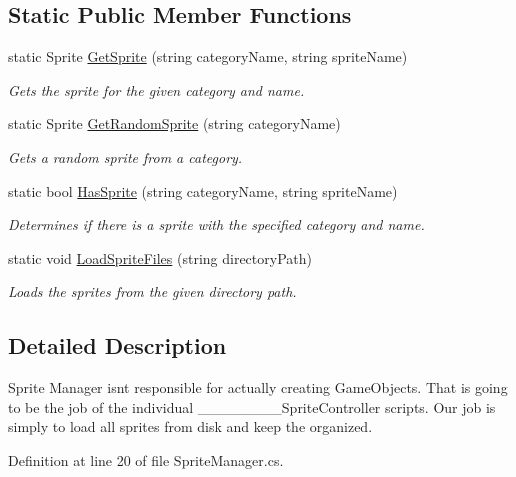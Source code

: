 \subsection*{Static Public Member Functions}
\begin{DoxyCompactItemize}
\item 
static Sprite \hyperlink{class_sprite_manager_a726f293c39df8c71073dfae36c8ac9ec}{Get\+Sprite} (string category\+Name, string sprite\+Name)
\begin{DoxyCompactList}\small\item\em Gets the sprite for the given category and name. \end{DoxyCompactList}\item 
static Sprite \hyperlink{class_sprite_manager_afad870a040301dad12012508ed1f4fa4}{Get\+Random\+Sprite} (string category\+Name)
\begin{DoxyCompactList}\small\item\em Gets a random sprite from a category. \end{DoxyCompactList}\item 
static bool \hyperlink{class_sprite_manager_a1eed6966816d35c500887cc0094b6b26}{Has\+Sprite} (string category\+Name, string sprite\+Name)
\begin{DoxyCompactList}\small\item\em Determines if there is a sprite with the specified category and name. \end{DoxyCompactList}\item 
static void \hyperlink{class_sprite_manager_aa42d46dc8725b403f8c0d54830209e35}{Load\+Sprite\+Files} (string directory\+Path)
\begin{DoxyCompactList}\small\item\em Loads the sprites from the given directory path. \end{DoxyCompactList}\end{DoxyCompactItemize}


\subsection{Detailed Description}
Sprite Manager isn\textquotesingle{}t responsible for actually creating Game\+Objects. That is going to be the job of the individual \+\_\+\+\_\+\+\_\+\+\_\+\+\_\+\+\_\+\+\_\+\+\_\+\+Sprite\+Controller scripts. Our job is simply to load all sprites from disk and keep the organized. 



Definition at line 20 of file Sprite\+Manager.\+cs.



